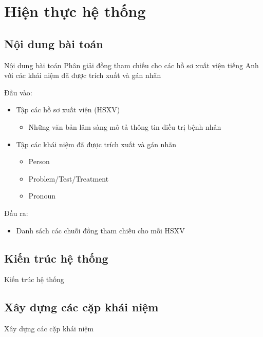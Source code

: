 \section{Hiện thực hệ thống}
\subsection{Nội dung bài toán}
\begin{frame}{Nội dung bài toán}
\putlogo
Phân giải đồng tham chiếu cho các hồ sơ xuất viện tiếng Anh với các khái niệm đã được trích xuất và gán nhãn

Đầu vào:
\begin{itemize}
	\item Tập các hồ sơ xuất viện (HSXV)
	\begin{itemize}
		\item Những văn bản lâm sàng mô tả thông tin điều trị bệnh nhân
	\end{itemize}
	\item Tập các khái niệm đã được trích xuất và gán nhãn
	\begin{itemize}
		\item Person
		\item Problem/Test/Treatment
		\item Pronoun
	\end{itemize}
\end{itemize}

Đầu ra: 
\begin{itemize}
\item Danh sách các chuỗi đồng tham chiếu cho mỗi HSXV
\end{itemize}
\end{frame}

\subsection{Kiến trúc hệ thống}
\begin{frame}{Kiến trúc hệ thống}
\putlogo
\end{frame}

\subsection{Xây dựng các cặp khái niệm}
\begin{frame}{Xây dựng các cặp khái niệm}
\putlogo
\end{frame}

